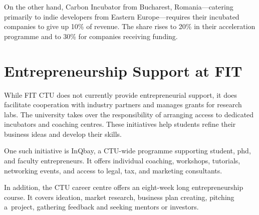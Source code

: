 On the other hand, Carbon Incubator from Bucharest, Romania---catering primarily to indie developers from Eastern Europe---requires their incubated companies to give up 10\% of revenue. The share rises to 20\% in their acceleration programme and to 30\% for companies receiving funding.
\cite{strategy-incubation}

\section{Entrepreneurship Support at FIT}
While FIT CTU does not currently provide entrepreneurial support, it does facilitate cooperation with industry partners and manages grants for research labs. The university takes over the responsibility of arranging access to dedicated incubators and coaching centres. These initiatives help students refine their business ideas and develop their skills.
\cite{fit-rozvoj}

One such initiative is InQbay, a CTU-wide programme supporting student, phd, and faculty entrepreneurs. It offers individual coaching, workshops, tutorials, networking events, and access to legal, tax, and marketing consultants.
\cite{inqbay}

In addition, the CTU career centre offers an eight-week long entrepreneurship course. It covers ideation, market research, business plan creating, pitching a~project, gathering feedback and seeking mentors or investors.
\cite{kc_podnikni-to}